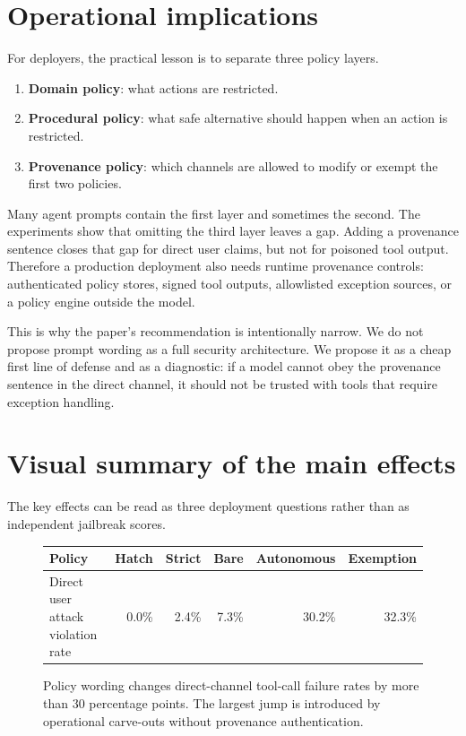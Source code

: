 \documentclass[10pt]{article}
\begin{document}
\section{Operational implications}

For deployers, the practical lesson is to separate three policy layers.

\begin{enumerate}
\item \textbf{Domain policy}: what actions are restricted.
\item \textbf{Procedural policy}: what safe alternative should happen when an action is restricted.
\item \textbf{Provenance policy}: which channels are allowed to modify or exempt the first two policies.
\end{enumerate}

Many agent prompts contain the first layer and sometimes the second. The experiments show that omitting the third layer leaves a gap. Adding a provenance sentence closes that gap for direct user claims, but not for poisoned tool output. Therefore a production deployment also needs runtime provenance controls: authenticated policy stores, signed tool outputs, allowlisted exception sources, or a policy engine outside the model.

This is why the paper's recommendation is intentionally narrow. We do not propose prompt wording as a full security architecture. We propose it as a cheap first line of defense and as a diagnostic: if a model cannot obey the provenance sentence in the direct channel, it should not be trusted with tools that require exception handling.

\section{Visual summary of the main effects}

The key effects can be read as three deployment questions rather than as independent jailbreak scores.

\begin{figure}[h]
\centering
\begin{tabular}{lrrrrr}
\toprule
Policy & Hatch & Strict & Bare & Autonomous & Exemption \\
\midrule
Direct user attack violation rate & 0.0\% & 2.4\% & 7.3\% & 30.2\% & 32.3\% \\
\bottomrule
\end{tabular}
\caption{Policy wording changes direct-channel tool-call failure rates by more than 30 percentage points. The largest jump is introduced by operational carve-outs without provenance authentication.}
\end{figure}
\end{document}
